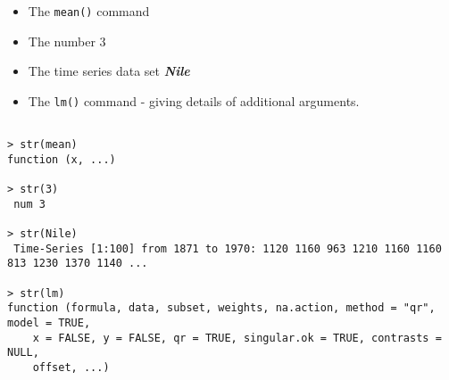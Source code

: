\begin{itemize}
\item The \texttt{mean()} command
\item The number 3
\item The time series data set \textit{\textbf{Nile}}
\item The \texttt{lm()} command - giving details of additional arguments.
\end{itemize}
\begin{verbatim}

> str(mean)
function (x, ...)  

> str(3)
 num 3

> str(Nile)
 Time-Series [1:100] from 1871 to 1970: 1120 1160 963 1210 1160 1160 813 1230 1370 1140 ...

> str(lm)
function (formula, data, subset, weights, na.action, method = "qr", model = TRUE, 
    x = FALSE, y = FALSE, qr = TRUE, singular.ok = TRUE, contrasts = NULL, 
    offset, ...) 

\end{verbatim}


